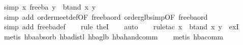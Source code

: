 \begin{isabellebody}
\endisatagproof
{\isafoldproof}%
%
\isadelimproof
\isanewline
%
\endisadelimproof
\isanewline
{}\isamarkupfalse%
\ {}simp{}{}\ {}x\ {}\isactrlbsub free{}ba\isactrlesub \ y\ {}\ bt{}and\ x\ y{}\isanewline
%
\isadelimproof
\ \ %
\endisadelimproof
%
\isatagproof
{}\isamarkupfalse%
\ {}simp\ add{}\ order{}meet{}def{}OF\ free{}ba{}ord{}\ order{}glb{}simp{}OF\ free{}ba{}ord{}{}\isanewline
\ \ \isamarkupfalse%
\ {}simp\ add{}\ free{}ba{}def{}\isanewline
\ \ \isamarkupfalse%
\ {}rule\ the{}I{}{}\isanewline
\ \ \isamarkupfalse%
\ auto\isanewline
\ \ \isamarkupfalse%
\ {}rule{}tac\ x\ {}\ {}bt{}and\ x\ y{}\ \ exI{}\isanewline
\ \ \isamarkupfalse%
\ {}metis\ hba{}absorb{}\ hba{}distl\ hba{}glb{}\ hba{}hand{}comm{}\isanewline
\ \ \isamarkupfalse%
\ {}metis\ hba{}comm{}\isanewline

\end{isabellebody}
